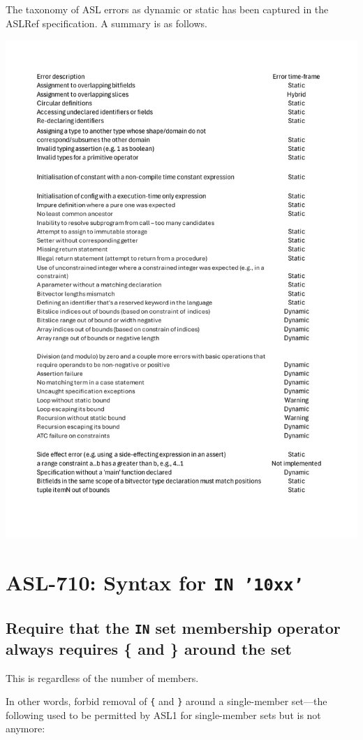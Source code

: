 The taxonomy of ASL errors as dynamic or static has been captured in the ASLRef
specification. A summary is as follows.

\includegraphics[width=\textwidth]{ASL-error-status.pdf}

\section{ASL-710: Syntax for \texttt{IN '10xx'}}

\subsection{Require that the \texttt{IN} set membership operator always
requires \{ and \} around the set} 

This is regardless of the number of members.

In other words, forbid removal of \texttt{\{} and \texttt{\}} around a
single-member set---the following used to be permitted by ASL1 for
single-member sets but is not anymore:

